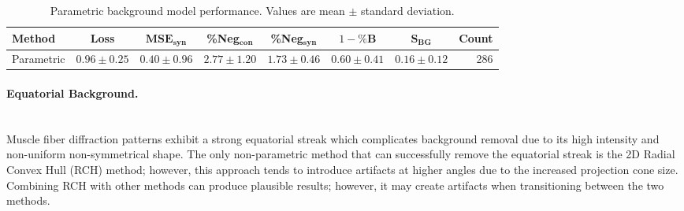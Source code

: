 \documentclass[iucr,review]{iucrjournals}
\begin{document}

\begin{table}[t]
\caption{Parametric background model performance. Values are mean $\pm$ standard deviation.}
\label{tab:param_performance}
\centering
\small
\setlength{\tabcolsep}{4pt}
\renewcommand{\arraystretch}{1.05}
\begin{tabular}{@{}lccccccr@{}}
\toprule
\textbf{Method} & Loss & $\mathbf{MSE}_{\mathbf{syn}}$ & \textbf{\%Neg$_{\mathbf{con}}$} & \textbf{\%Neg$_{\mathbf{syn}}$} & \textbf{$1-\%\mathbf{B}$} & \textbf{$\mathbf{S}_{\mathbf{BG}}$} & Count \\ \midrule
Parametric & $0.96 \pm 0.25$ & $0.40 \pm 0.96$ & $2.77 \pm 1.20$ & $1.73 \pm 0.46$ & $0.60 \pm 0.41$ & $0.16 \pm 0.12$ & 286 \\
\bottomrule
\end{tabular}
\end{table}



\paragraph{Equatorial Background.} \\

Muscle fiber diffraction patterns exhibit a strong equatorial streak which complicates background removal
due to its high intensity and non-uniform non-symmetrical shape. The only non-parametric method that can
successfully remove the equatorial streak is the 2D Radial Convex Hull (RCH) method; however, this approach tends to
introduce artifacts at higher angles due to the increased projection cone size. Combining RCH with other
methods can produce plausible results; however, it may create artifacts when transitioning between the two methods.
\end{document}
